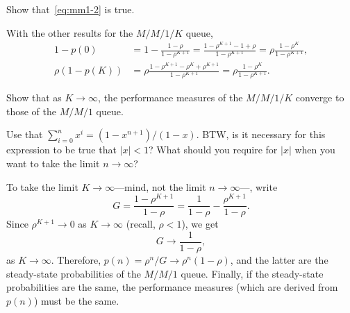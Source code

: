 \documentclass[stochastic-or.tex]{subfiles}
\begin{document}
\begin{extra}\label{ex:l-33}
Show that~\cref{eq:mm1-2} is true.
\begin{solution}
With the other results for the $M/M/1/K$ queue,
\begin{align*}
  1-p(0) &= 1-\frac{1-\rho}{1-\rho^{K+1}} = \frac{1-\rho^{K+1} - 1 + \rho}{1-\rho^{K+1}} = \rho \frac{1-\rho^{K}}{1-\rho^{K+1}}, \\
  \rho (1-p(K)) &= \rho \frac{1-\rho^{K+1} - \rho^K + \rho^{K+1}}{1-\rho^{K+1}} = \rho \frac{1-\rho^{K}}{1-\rho^{K+1}}.
\end{align*}
\end{solution}
\end{extra}

\begin{extra}\label{ex:40}
 Show that as $K\to\infty$, the performance measures of the $M/M/1/K$ converge to those of the $M/M/1$ queue.
\begin{hint}
Use that $\sum_{i=0}^n x^i = (1-x^{n+1})/(1-x)$. BTW, is it
 necessary for this expression to be true that $|x|<1$? What should
 you require for $|x|$ when you want to take the limit
 $n\to\infty$?
\end{hint}
\begin{solution}
To take the limit $K\to\infty$---mind, not the limit $n\to\infty$---, write
\begin{equation*}
G= \frac{1-\rho^{K+1}}{1-\rho} = \frac{1}{1-\rho} -\frac{\rho^{K+1}}{1-\rho}.
\end{equation*}
Since $\rho^{K+1}\to 0$ as $K\to \infty$ (recall, $\rho<1$), we get
\begin{equation*}
G \to \frac{1}{1-\rho},
\end{equation*}
as $K\to\infty$. Therefore, $p(n)=\rho^n/G \to \rho^n(1-\rho)$, and
the latter are the steady-state probabilities of the $M/M/1$
queue. Finally, if the steady-state probabilities are the same, the
performance measures (which are derived from $p(n)$) must be the same.
\end{solution}
\end{extra}
\end{document}
